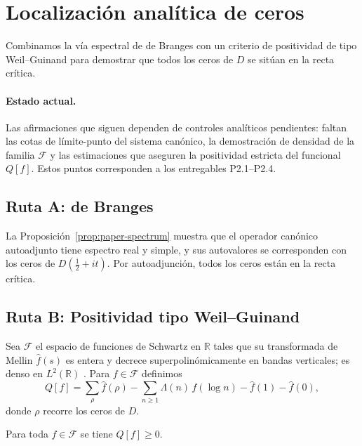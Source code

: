 \section{Localización analítica de ceros}

Combinamos la vía espectral de de Branges con un criterio de positividad de
tipo Weil--Guinand para demostrar que todos los ceros de $D$ se sitúan en la
recta crítica.

\paragraph{Estado actual.}
Las afirmaciones que siguen dependen de controles analíticos pendientes: faltan
las cotas de límite-punto del sistema canónico, la demostración de densidad de
la familia $\mathcal{F}$ y las estimaciones que aseguren la positividad estricta
del funcional $Q[f]$.  Estos puntos corresponden a los entregables P2.1--P2.4.

\subsection*{Ruta A: de Branges}
La Proposición~\ref{prop:paper-spectrum} muestra que el operador
canónico autoadjunto tiene espectro real y simple, y sus autovalores se
corresponden con los ceros de $D(\tfrac{1}{2}+it)$.  Por autoadjunción, todos los
ceros están en la recta crítica.

\subsection*{Ruta B: Positividad tipo Weil--Guinand}

\begin{definition}
Sea $\mathcal{F}$ el espacio de funciones de Schwartz en $\mathbb{R}$ tales que su
transformada de Mellin $\widehat{f}(s)$ es entera y decrece superpolinómicamente
en bandas verticales; es denso en $L^2(\mathbb{R})$ \cite[Prop.~1]{Guinand1955}.
Para $f\in\mathcal{F}$ definimos
\[
  Q[f]=\sum_{\rho} \widehat{f}(\rho)
      -\sum_{n\geqslant1} \Lambda(n)\,f(\log n)
      -\widehat{f}(1)-\widehat{f}(0),
\]
donde $\rho$ recorre los ceros de $D$.
\end{definition}

\begin{theorem}\label{thm:paper-positivity}
Para toda $f\in\mathcal{F}$ se tiene $Q[f]\geqslant0$.
\end{theorem}

